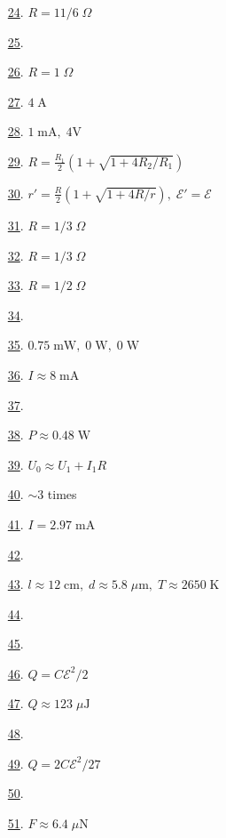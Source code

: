 \begin{multicols}{2}
\begin{enumerate}
	\item [\hyperlink{P24}{24}.] $R=11/6\;\Omega$ %
	\item [\hyperlink{P25}{25}.]  %
	\item [\hyperlink{P26}{26}.] $R=1\;\Omega$ %
	\item [\hyperlink{P27}{27}.] $4\;\text{A}$ %
	\item [\hyperlink{P28}{28}.] $1\;\text{mA},\;4\text{V}$ %
	\item [\hyperlink{P29}{29}.] $R=\frac{R_1}{2}\left(1+\sqrt{1+4R_2/R_1}\right)$ %
	\item [\hyperlink{P30}{30}.] $r'=\frac{R}{2}\left(1+\sqrt{1+4R/r}\right),\;\mathcal{E}'=\mathcal{E}$ %
	\item [\hyperlink{P31}{31}.] $R=1/3\;\Omega$ %
	\item [\hyperlink{P32}{32}.] $R=1/3\;\Omega$ %
	\item [\hyperlink{P33}{33}.] $R=1/2\;\Omega$ %
	\item [\hyperlink{P34}{34}.]  %
	\item [\hyperlink{P35}{35}.] $0.75\;\text{mW},\;0\;\text{W},\;0\;\text{W}$ %
	\item [\hyperlink{P36}{36}.] $I\approx8\;\text{mA}$ %
	\item [\hyperlink{P37}{37}.]  %
	\item [\hyperlink{P38}{38}.] $P\approx0.48\;\text{W}$ %
	\item [\hyperlink{P39}{39}.] $U_0\approx U_1+I_1R$ %
	\item [\hyperlink{P40}{40}.] $\sim 3$ times %
	\item [\hyperlink{P41}{41}.] $I=2.97\;\text{mA}$ %
	\item [\hyperlink{P42}{42}.]  %
	\item [\hyperlink{P43}{43}.] $l\approx12\;\text{cm},\;d\approx5.8\;\mu\text{m},\;T\approx2650\;\text{K}$ %
	\item [\hyperlink{P44}{44}.]  %
	\item [\hyperlink{P45}{45}.]  %
	\item [\hyperlink{P46}{46}.] $Q=C\mathcal{E}^2/2$ %
	\item [\hyperlink{P47}{47}.] $Q\approx123\;\mu\text{J}$ %
	\item [\hyperlink{P48}{48}.]  %
	\item [\hyperlink{P49}{49}.] $Q=2C\mathcal{E}^2/27$ %
	\item [\hyperlink{P50}{50}.]  %
	\item [\hyperlink{P51}{51}.] $F\approx6.4\;\mu\text{N}$ %

\end{enumerate}
\end{multicols}
